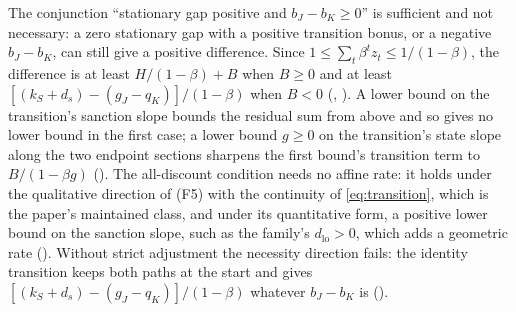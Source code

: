 The conjunction ``stationary gap positive and $b_J-b_K\ge0$'' is sufficient
and not necessary: a zero stationary gap with a positive transition bonus,
or a negative $b_J-b_K$, can still give a positive difference. Since
$1\le\sum_t\beta^tz_t\le1/(1-\beta)$, the difference is at least
$H/(1-\beta)+B$ when $B\ge0$ and at least $[(k_S+d_s)-(g_J-q_K)]/(1-\beta)$
when $B<0$ (,
). A lower bound on the transition's sanction slope bounds the
residual sum from above and so gives no lower bound in the first case; a lower
bound $g\ge0$ on the transition's state slope along the two endpoint sections sharpens the first bound's
transition term to $B/(1-\beta g)$
(). The all-discount
condition needs no affine rate: it holds under the qualitative direction of
\textup{(F5)} with the continuity of \eqref{eq:transition}, which is the
paper's maintained class, and under its quantitative form, a positive lower
bound on the sanction slope, such as the family's $d_{\mathrm{lo}}>0$, which adds a
geometric rate (). Without
strict adjustment the necessity direction fails: the identity transition keeps
both paths at the start and gives $[(k_S+d_s)-(g_J-q_K)]/(1-\beta)$ whatever
$b_J-b_K$ is ().

